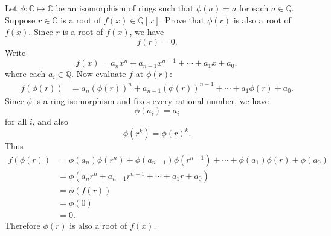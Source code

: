 \begin{problem}{
    Let $\phi:\mathbb{C}\mapsto\mathbb{C}$ be an isomorphism of rings such that $\phi(a)=a$ for each $a\in\mathbb{Q}$.
    Suppose $r\in\mathbb{C}$ is a root of $f(x)\in\mathbb{Q}[x]$.
    Prove that $\phi(r)$ is also a root of $f(x)$.
}
    Since $r$ is a root of $f(x)$, we have
    \[
        f(r)=0.
    \]
    Write
    \[
        f(x)=a_{n}x^n+a_{n-1}x^{n-1}+\cdots+a_{1}x+a_0,
    \]
    where each $a_i\in\mathbb{Q}$.
    Now evaluate $f$ at $\phi(r)$:
    \begin{align*}
        f(\phi(r))
        &=
        a_n(\phi(r))^n+a_{n-1}(\phi(r))^{n-1}+\cdots+a_1\phi(r)+a_0.
    \end{align*}
    Since $\phi$ is a ring isomorphism and fixes every rational number, we have
    \[
        \phi(a_i)=a_i
    \]
    for all $i$, and also
    \[
        \phi(r^k)=\phi(r)^k.
    \]
    Thus
    \begin{align*}
        f(\phi(r))
        &=
        \phi(a_n)\phi(r^n)+\phi(a_{n-1})\phi(r^{n-1})+\cdots+\phi(a_1)\phi(r)+\phi(a_0)\\
        &=
        \phi(a_{n}r^n+a_{n-1}r^{n-1}+\cdots+a_{1}r+a_0)\\
        &=
        \phi(f(r))\\
        &=
        \phi(0)\\
        &=
        0.
    \end{align*}
    Therefore $\phi(r)$ is also a root of $f(x)$.
\end{problem}

